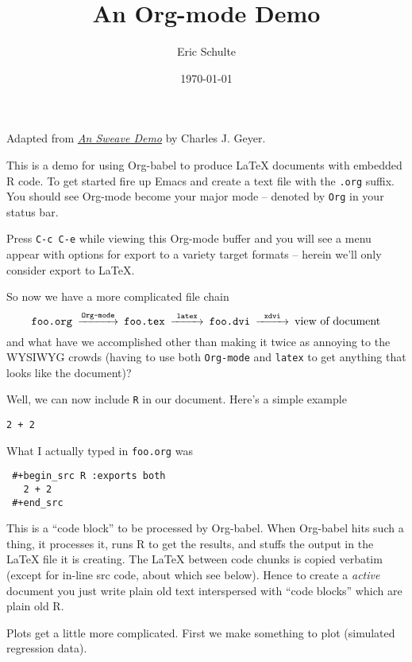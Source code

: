 \documentclass[11pt]{article}
\title{An Org-mode Demo}
\author{Eric Schulte}
\date{\today}
\begin{document}
\maketitle


\begin{center}
Adapted from \emph{\href{http://www.stat.umn.edu/~charlie/Sweave/foo.Rnw}{An Sweave Demo}} by Charles J. Geyer.
\end{center}

This is a demo for using Org-babel to produce \LaTeX{} documents with
embedded R code.  To get started fire up Emacs and create a text file
with the \texttt{.org} suffix.  You should see Org-mode become your major
mode -- denoted by \texttt{Org} in your status bar.

Press \texttt{C-c C-e} while viewing this Org-mode buffer and you will see a
menu appear with options for export to a variety target formats --
herein we'll only consider export to \LaTeX{}.

So now we have a more complicated file chain
$$
\begin{CD}
   \texttt{foo.org}
   @>\texttt{Org-mode}>>
   \texttt{foo.tex}
   @>\texttt{latex}>>
   \texttt{foo.dvi}
   @>\texttt{xdvi}>>
   \text{view of document}
\end{CD}
$$
and what have we accomplished other than making it twice as annoying
to the WYSIWYG crowds (having to use both \texttt{Org-mode} and \texttt{latex} to get
anything that looks like the document)?

Well, we can now include \texttt{R} in our document.  Here's a simple example

\begin{verbatim}
2 + 2
\end{verbatim}
What I actually typed in \texttt{foo.org} was
\begin{verbatim}
 #+begin_src R :exports both
   2 + 2
 #+end_src
\end{verbatim}

This is a ``code block'' to be processed by Org-babel.  When Org-babel
hits such a thing, it processes it, runs R to get the results, and
stuffs the output in the \LaTeX{} file it is creating.  The \LaTeX{} between
code chunks is copied verbatim (except for in-line src code, about
which see below).  Hence to create a \emph{active} document you just write
plain old text interspersed with ``code blocks'' which are plain old R.

Plots get a little more complicated.  First we make something to plot
(simulated regression data).
\end{document}
